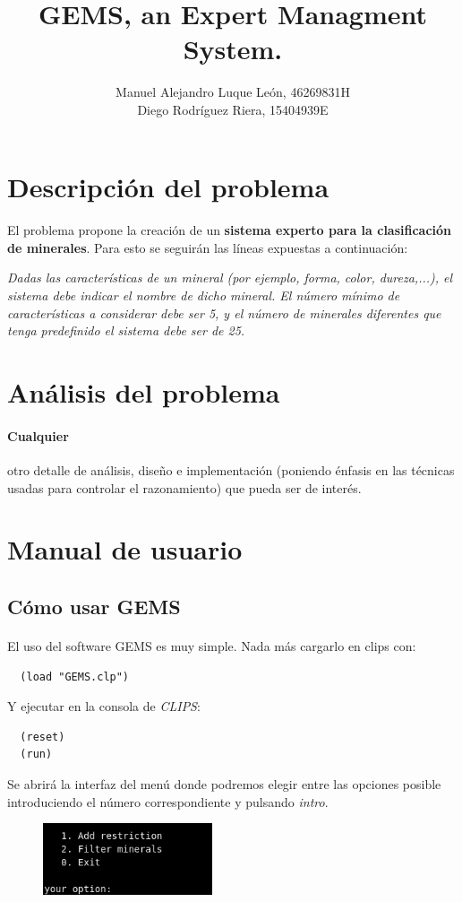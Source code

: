 \documentclass[a4paper,10pt]{article}
\title{GEMS, an Expert Managment System.}
\author{Manuel Alejandro Luque León, 46269831H\\Diego Rodríguez Riera, 15404939E}
\begin{document}
\maketitle
\pagebreak
\tableofcontents
\pagebreak

\section{Descripción del problema}
\paragraph{}El problema propone la creación de un \textbf{sistema experto para la clasificación de minerales}. Para esto se seguirán las líneas expuestas a continuación:

\textit{Dadas las características de un mineral (por ejemplo, forma, color, dureza,...), el sistema debe indicar el nombre de dicho mineral.  El número mínimo de características a considerar debe ser 5, y el número de minerales diferentes que tenga predefinido el sistema debe ser de 25.}
\pagebreak


\section{Análisis del problema}
\paragraph{Cualquier} otro detalle de análisis, diseño e implementación (poniendo énfasis en las técnicas usadas para controlar el razonamiento) que pueda ser de interés.
\pagebreak


\section{Manual de usuario}
\subsection{Cómo usar GEMS}
\paragraph{}El uso del software GEMS es muy simple. Nada más cargarlo en clips con:
\begin{lstlisting}
  (load "GEMS.clp")
\end{lstlisting}
Y ejecutar en la consola de \textit{CLIPS}:
\begin{lstlisting}
  (reset)
  (run)
\end{lstlisting}
Se abrirá la interfaz del menú donde podremos elegir entre las opciones posible introduciendo el número correspondiente y pulsando \textit{intro}.
\begin{figure}[ht]
  \centering
  \includegraphics[width=50mm]{./figures/Figure1.png}
\end{figure}
\end{document}
